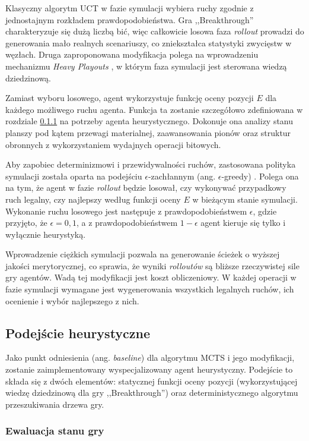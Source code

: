 \documentclass{article}
\begin{document}
Klasyczny algorytm UCT w fazie symulacji wybiera ruchy zgodnie z jednostajnym rozkładem prawdopodobieństwa. Gra ,,Breakthrough'' charakteryzuje się dużą liczbą bić, więc całkowicie losowa faza \textit{rollout} prowadzi do generowania mało realnych scenariuszy, co zniekształca statystyki zwycięstw w węzłach. Druga zaproponowana modyfikacja polega na wprowadzeniu mechanizmu \textit{Heavy Playouts} \cite{browne2012survey}, w którym faza symulacji jest sterowana wiedzą dziedzinową.

Zamiast wyboru losowego, agent wykorzystuje funkcję oceny pozycji $E$ dla każdego możliwego ruchu agenta. Funkcja ta zostanie szczegółowo zdefiniowana w rozdziale \ref{sub:ewaluacja_stanu_gry} na potrzeby agenta heurystycznego. Dokonuje ona analizy stanu planszy pod kątem przewagi materialnej, zaawansowania pionów oraz struktur obronnych z wykorzystaniem wydajnych operacji bitowych.

Aby zapobiec determinizmowi i przewidywalności ruchów, zastosowana polityka symulacji została oparta na podejściu $\epsilon$-zachłannym (ang. $\epsilon$-greedy) \cite{sutton2018reinforcement}. Polega ona na tym, że agent w fazie \textit{rollout} będzie losował, czy wykonywać przypadkowy ruch legalny, czy najlepszy według funkcji oceny $E$ w bieżącym stanie symulacji. Wykonanie ruchu losowego jest następuje z prawdopodobieństwem $\epsilon$, gdzie przyjęto, że $\epsilon = 0,1$, a z prawdopodobieństwem $1-\epsilon$ agent kieruje się tylko i wyłącznie heurystyką.

Wprowadzenie ciężkich symulacji pozwala na generowanie ścieżek o wyższej jakości merytorycznej, co sprawia, że wyniki \textit{rolloutów} są bliższe rzeczywistej sile gry agentów. Wadą tej modyfikacji jest koszt obliczeniowy. W każdej operacji w fazie symulacji wymagane jest wygenerowania wszystkich legalnych ruchów, ich ocenienie i wybór najlepszego z nich.

\subsection{Podejście heurystyczne}

Jako punkt odniesienia (ang. \textit{baseline}) dla algorytmu MCTS i jego modyfikacji, zostanie zaimplementowany wyspecjalizowany agent heurystyczny. Podejście to składa się z dwóch elementów: statycznej funkcji oceny pozycji (wykorzystującej wiedzę dziedzinową dla gry ,,Breakthrough'') oraz deterministycznego algorytmu przeszukiwania drzewa gry.

\subsubsection{Ewaluacja stanu gry} \label{sub:ewaluacja_stanu_gry}
\end{document}
